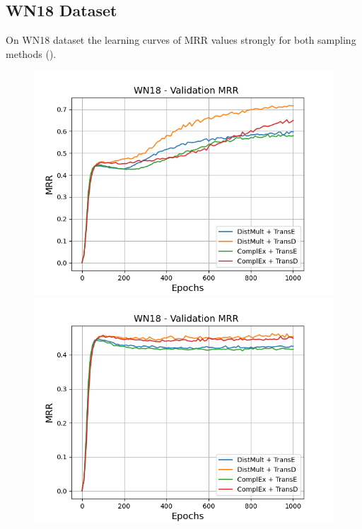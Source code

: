\subsection{WN18 Dataset}
\label{subsec:uncertainty_wn18}

On \textsc{WN18} dataset the learning curves of MRR values strongly for both sampling methods ().
\begin{figure}
    \centering
    \begin{minipage}{.5\textwidth}
      \centering
      \includegraphics[width=0.9\linewidth]{figures/results/gan_train/not_pretrained/random/wn18/epochs1000/random_wn18_mrrs.png}
    \end{minipage}%
    \begin{minipage}{.5\textwidth}
      \centering
      \includegraphics[width=0.9\linewidth]{figures/results/gan_train/not_pretrained/uncertainty/max_distribution/entropy/wn18/1k_epochs/uncertainty_wn18_mrrs.png}

\end{minipage}
\end{figure}
